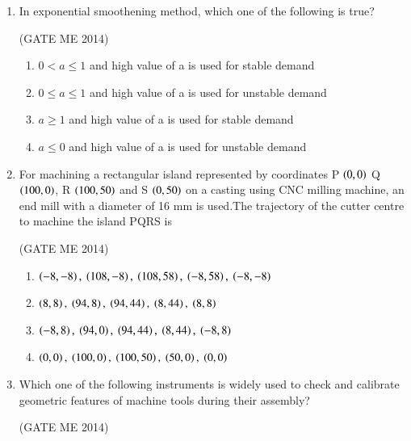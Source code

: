 \documentclass[journal]{IEEEtran}
\numberwithin{equation}{enumi}
\numberwithin{figure}{enumi}
\begin{document}
\begin{enumerate}
\begin{multicols}{4}
    \begin{enumerate}
        \item Normal
        \item poisson
        \item erlang
        \item beta
    \end{enumerate}
\end{multicols}

\item 
In exponential smoothening method, which one of the following is true?

 \hfill{(GATE ME 2014)}
 
\begin{enumerate}
    \item $0 < a \le 1$ and high value of a is used for stable demand
\item$0 \le a \le 1$ and high value of a is used for unstable demand
\item  $a \ge 1$ and high value of a is used for stable demand
\item  $a \le 0$ and high value of a is used for unstable demand
\end{enumerate}
\item For machining a rectangular island represented by coordinates P $\left(0,0\right)$ Q $\left(100,0\right)$, R $\left(100,50\right)$ and S $\left(0,50\right)$ on a casting using CNC milling machine, an end mill with a diameter of 16 mm is used.The trajectory of the cutter centre to machine the island PQRS is

 \hfill{(GATE ME 2014)}
 
\begin{enumerate}   
    \item  $\brak{-8,-8},\ \brak{108,-8},\ \brak{108,58},\ \brak{-8,58},\ \brak{-8,-8}$
    \item  $\brak{8,8},\ \brak{94,8},\ \brak{94,44},\ \brak{8,44},\ \brak{8,8}$
    \item  $\brak{-8,8},\ \brak{94,0},\ \brak{94,44},\ \brak{8,44},\ \brak{-8,8}$
    \item  $\brak{0,0},\ \brak{100,0},\ \brak{100,50},\ \brak{50,0},\ \brak{0,0}$
\end{enumerate}

\item Which one of the following instruments is widely used to check and calibrate geometric features of
machine tools during their assembly?

 \hfill{(GATE ME 2014)}
 

\end{enumerate}
\end{document}
